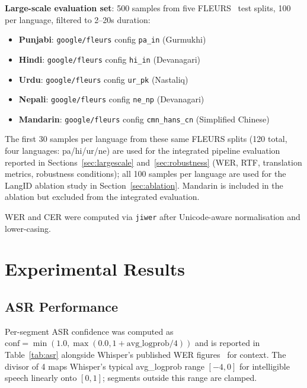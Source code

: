 \documentclass[12pt, onecolumn]{IEEEtran}
\begin{document}
\textbf{Large-scale evaluation set}: 500 samples from five FLEURS~\cite{conneau2023fleurs} test splits, 100 per language, filtered to 2--20s duration:
\begin{itemize}
\item \textbf{Punjabi}: \texttt{google/fleurs} config \texttt{pa\_in} (Gurmukhi)
\item \textbf{Hindi}: \texttt{google/fleurs} config \texttt{hi\_in} (Devanagari)
\item \textbf{Urdu}: \texttt{google/fleurs} config \texttt{ur\_pk} (Nastaliq)
\item \textbf{Nepali}: \texttt{google/fleurs} config \texttt{ne\_np} (Devanagari)
\item \textbf{Mandarin}: \texttt{google/fleurs} config \texttt{cmn\_hans\_cn} (Simplified Chinese)
\end{itemize}

The first 30 samples per language from these same FLEURS splits (120 total, four languages: pa/hi/ur/ne) are used for the integrated pipeline evaluation reported in Sections~\ref{sec:largescale} and~\ref{sec:robustness} (WER, RTF, translation metrics, robustness conditions); all 100 samples per language are used for the LangID ablation study in Section~\ref{sec:ablation}. Mandarin is included in the ablation but excluded from the integrated evaluation.

WER and CER were computed via \texttt{jiwer} after Unicode-aware normalisation and lower-casing.

\section{Experimental Results}

\subsection{ASR Performance}
\label{sec:asr}

Per-segment ASR confidence was computed as $\text{conf} = \min(1.0, \max(0.0, 1 + \text{avg\_logprob}/4))$ and is reported in Table~\ref{tab:asr} alongside Whisper's published WER figures~\cite{radford2022whisper} for context. The divisor of 4 maps Whisper's typical avg\_logprob range $[-4, 0]$ for intelligible speech linearly onto $[0, 1]$; segments outside this range are clamped.
\end{document}
